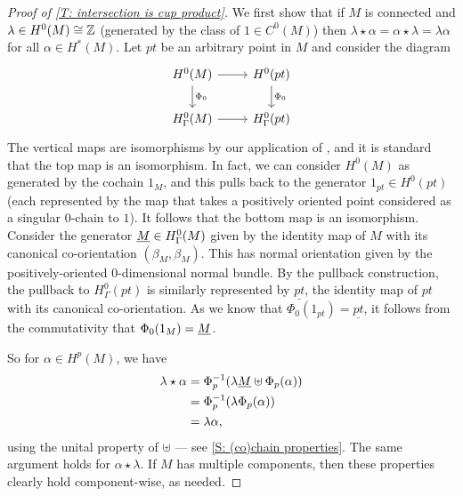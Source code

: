 \begin{proof}[Proof of \cref{T: intersection is cup product}]
	We first show that if $M$ is connected and $\lambda \in H^0(M) \cong \mathbb{Z}$ (generated by the class of $1 \in C^0(M)$) then $\lambda\star \alpha = \alpha\star \lambda = \lambda\alpha$ for all $\alpha \in H^*(M)$.
	Let $pt$ be an arbitrary point in $M$ and consider the diagram
	\[
	\begin{tikzcd}
		H^0(M) \arrow{r} \arrow[d, "\Phi_0"] & H^0(pt) \arrow[d, "\Phi_0"] \\
		H_\Gamma^0(M) \arrow{r} & H_\Gamma^0(pt)
	\end{tikzcd}
	\]
	The vertical maps are isomorphisms by our application of \cite[Theorem 10]{Krec10b}, and it is standard that the top map is an isomorphism.
	In fact, we can consider $H^0(M)$ as generated by the cochain $1_M$, and this pulls back to the generator $1_{pt} \in H^0(pt)$ (each represented by the map that takes a positively oriented point considered as a singular $0$-chain to $1$).
	It follows that the bottom map is an isomorphism.
	Consider the generator $\underline{M} \in H_\Gamma^0(M)$ given by the identity map of $M$ with its canonical co-orientation $(\beta_M,\beta_M)$.
	This has normal orientation given by the positively-oriented $0$-dimensional normal bundle.
	By the pullback construction, the pullback to $H^0_\Gamma(pt)$ is similarly represented by $\underline{pt}$, the identity map of $pt$ with its canonical co-orientation.
	As we know that $\Phi_0(1_{pt}) = \underline{pt}$, it follows from the commutativity that $\Phi_0(1_M) = \underline{M}$.

	So for $\alpha \in H^p(M)$, we have
	\begin{align*}
		\lambda \star \alpha
		& = \Phi_p^{-1}(\lambda\underline{M} \uplus \Phi_p(\alpha)) \\
		& = \Phi_p^{-1}(\lambda\Phi_p(\alpha)) \\
		& = \lambda\alpha,
	\end{align*}
	using the unital property of $\uplus$ --- see \cref{S: (co)chain properties}.
	The same argument holds for $\alpha\star \lambda$.
	If $M$ has multiple components, then these properties clearly hold component-wise, as needed.


\end{proof}
